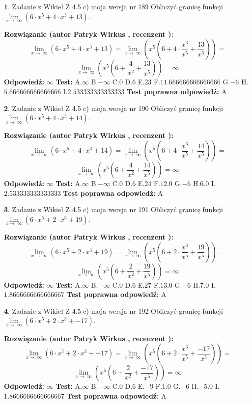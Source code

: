 \documentclass[12pt, a4paper]{article}
\theoremstyle{definition} %
\newtheorem{zad}{}
\newcommand{\zadStart}[1]{\begin{zad}#1\newline}
\newcommand{\zadStop}{\end{zad}}
\newcommand{\rozwStart}[2]{\noindent \textbf{Rozwiązanie (autor #1 , recenzent #2): }\newline}
\newcommand{\rozwStop}{\newline}
\newcommand{\odpStart}{\noindent \textbf{Odpowiedź:}\newline}
\newcommand{\odpStop}{\newline}
\newcommand{\testStart}{\noindent \textbf{Test:}\newline}
\newcommand{\testStop}{\newline}
\newcommand{\kluczStart}{\noindent \textbf{Test poprawna odpowiedź:}\newline}
\newcommand{\kluczStop}{\newline}
\begin{document}
\zadStart{Zadanie z Wikieł Z 4.5 c) moja wersja nr 189}
Obliczyć granicę funkcji  $\lim\limits_{x\to\ \infty}(6 \cdot x^{5}+4 \cdot x^{3}+13)$.
\zadStop
\rozwStart{Patryk Wirkus}{}
$$\lim\limits_{x\to\ \infty}(6 \cdot x^{5}+4 \cdot x^{3}+13) = \lim\limits_{x\to\ \infty}(x^{5}(6 +4 \cdot \frac{x^{3}}{x^{5}}+\frac{13}{x^{5}})) =$$ $$\lim\limits_{x\to\ \infty}(x^{5}(6 +\frac{4}{x^{2}}+\frac{13}{x^{5}})) =\infty$$
\rozwStop
\odpStart
$\infty$
\odpStop
\testStart
A.$\infty$ B.$-\infty$ C.$0$ D.$6$ E.$23$
F.$11.666666666666666$ G.$-6$
H.$5.666666666666666$
I.$2.533333333333333$
\testStop
\kluczStart
A
\kluczStop



\zadStart{Zadanie z Wikieł Z 4.5 c) moja wersja nr 190}
Obliczyć granicę funkcji  $\lim\limits_{x\to\ \infty}(6 \cdot x^{5}+4 \cdot x^{3}+14)$.
\zadStop
\rozwStart{Patryk Wirkus}{}
$$\lim\limits_{x\to\ \infty}(6 \cdot x^{5}+4 \cdot x^{3}+14) = \lim\limits_{x\to\ \infty}(x^{5}(6 +4 \cdot \frac{x^{3}}{x^{5}}+\frac{14}{x^{5}})) =$$ $$\lim\limits_{x\to\ \infty}(x^{5}(6 +\frac{4}{x^{2}}+\frac{14}{x^{5}})) =\infty$$
\rozwStop
\odpStart
$\infty$
\odpStop
\testStart
A.$\infty$ B.$-\infty$ C.$0$ D.$6$ E.$24$
F.$12.0$ G.$-6$
H.$6.0$
I.$2.533333333333333$
\testStop
\kluczStart
A
\kluczStop



\zadStart{Zadanie z Wikieł Z 4.5 c) moja wersja nr 191}
Obliczyć granicę funkcji  $\lim\limits_{x\to\ \infty}(6 \cdot x^{5}+2 \cdot x^{3}+19)$.
\zadStop
\rozwStart{Patryk Wirkus}{}
$$\lim\limits_{x\to\ \infty}(6 \cdot x^{5}+2 \cdot x^{3}+19) = \lim\limits_{x\to\ \infty}(x^{5}(6 +2 \cdot \frac{x^{3}}{x^{5}}+\frac{19}{x^{5}})) =$$ $$\lim\limits_{x\to\ \infty}(x^{5}(6 +\frac{2}{x^{2}}+\frac{19}{x^{5}})) =\infty$$
\rozwStop
\odpStart
$\infty$
\odpStop
\testStart
A.$\infty$ B.$-\infty$ C.$0$ D.$6$ E.$27$
F.$13.0$ G.$-6$
H.$7.0$
I.$1.8666666666666667$
\testStop
\kluczStart
A
\kluczStop



\zadStart{Zadanie z Wikieł Z 4.5 c) moja wersja nr 192}
Obliczyć granicę funkcji  $\lim\limits_{x\to\ \infty}(6 \cdot x^{5}+2 \cdot x^{3}+-17)$.
\zadStop
\rozwStart{Patryk Wirkus}{}
$$\lim\limits_{x\to\ \infty}(6 \cdot x^{5}+2 \cdot x^{3}+-17) = \lim\limits_{x\to\ \infty}(x^{5}(6 +2 \cdot \frac{x^{3}}{x^{5}}+\frac{-17}{x^{5}})) =$$ $$\lim\limits_{x\to\ \infty}(x^{5}(6 +\frac{2}{x^{2}}+\frac{-17}{x^{5}})) =\infty$$
\rozwStop
\odpStart
$\infty$
\odpStop
\testStart
A.$\infty$ B.$-\infty$ C.$0$ D.$6$ E.$-9$
F.$1.0$ G.$-6$
H.$-5.0$
I.$1.8666666666666667$
\testStop
\kluczStart
A
\kluczStop
\end{document}
